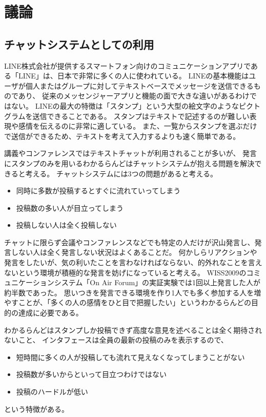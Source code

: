 \section{議論}

\subsection{チャットシステムとしての利用}

LINE株式会社が提供するスマートフォン向けのコミュニケーションアプリである「LINE」は、日本で非常に多くの人に使われている。
LINEの基本機能はユーザが個人またはグループに対してテキストベースでメッセージを送信できるものであり、
従来のメッセンジャーアプリと機能の面で大きな違いがあるわけではない。
LINEの最大の特徴は「スタンプ」という大型の絵文字のようなピクトグラムを送信できることである。
スタンプはテキストで記述するのが難しい表現や感情を伝えるのに非常に適している。
また、一覧からスタンプを選ぶだけで送信ができるため、テキストを考えて入力するよりも速く簡単である。

講義やコンファレンスではテキストチャットが利用されることが多いが、
発言にスタンプのみを用いるわかるらんどはチャットシステムが抱える問題を解決できると考える。
チャットシステムには3つの問題があると考える。

\begin{itemize}
\item 同時に多数が投稿するとすぐに流れていってしまう
\item 投稿数の多い人が目立ってしまう
\item 投稿しない人は全く投稿しない
\end{itemize}

チャットに限らず会議やコンファレンスなどでも特定の人だけが沢山発言し、発言しない人は全く発言しない状況はよくあることだ。
何かしらリアクションや発言をしたいが、気の利いたことを言わなければならない、的外れなことを言えないという環境が積極的な発言を妨げになっていると考える。
WISS2009のコミュニケーションシステム「On Air Forum」の実証実験では1回以上発言した人が約半数であった。
思いつきを発言できる環境を作り1人でも多く参加する人を増やすことが、「多くの人の感情をひと目で把握したい」というわかるらんどの目的の達成に必要である。

わかるらんどはスタンプしか投稿できず高度な意見を述べることは全く期待されないこと、
インタフェースは全員の最新の投稿のみを表示するので、

\begin{itemize}
\item 短時間に多くの人が投稿しても流れて見えなくなってしまうことがない
\item 投稿数が多いからといって目立つわけではない
\item 投稿のハードルが低い
\end{itemize}
という特徴がある。

